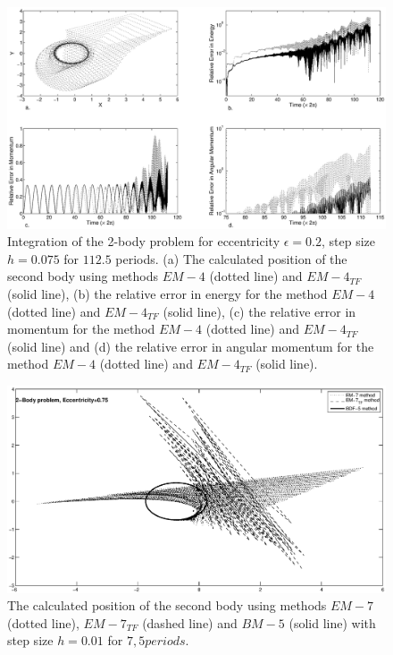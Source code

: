 \documentclass[acmtoms,acmnow]{acmtrans2m}
\begin{document}
\clearpage
\begin{figure}
\begin{center}
\includegraphics[width=15cm]{2bp_e_2_ME_4.eps}
\caption{Integration of the 2-body problem for eccentricity $\epsilon=0.2$, step size $h=0.075$ for $112.5$ periods. (a) The calculated position of the second body using methods $EM-4$ (dotted line) and $EM-4_{TF}$ (solid line), (b) the relative error in energy for the method $EM-4$ (dotted line) and $EM-4_{TF}$ (solid line), (c) the relative error in momentum for the method $EM-4$ (dotted line) and $EM-4_{TF}$ (solid line) and (d) the relative error in angular momentum for the method $EM-4$ (dotted line) and $EM-4_{TF}$ (solid line).} \label{fig_res_EM_4}
\end{center}
\end{figure}

\clearpage
\begin{figure}
\begin{center}
\includegraphics[width=15cm]{2bp_e_75_ME_7_BDF_5.eps}
\caption{The calculated position of the second body using methods $EM-7$ (dotted line), $EM-7_{TF}$ (dashed line) and $BM-5$ (solid line) with step size $h=0.01$ for $7,5 periods$.} \label{fig_res_EM_7}
\end{center}
\end{figure}
\end{document}
